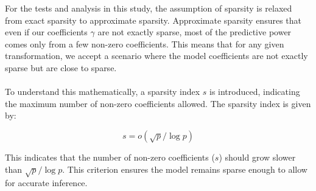 For the tests and analysis in this study, the assumption of sparsity is relaxed from exact sparsity to approximate sparsity. Approximate sparsity ensures that even if our coefficients $\gamma$ are not exactly sparse, most of the predictive power comes only from a few non-zero coefficients. This means that for any given transformation, we accept a scenario where the model coefficients are not exactly sparse but are close to sparse.\\
\\
To understand this mathematically, a sparsity index $s$ is introduced, indicating the maximum number of non-zero coefficients allowed. The sparsity index is given by:

\begin{equation}
s = o\left(\sqrt{p} / \log p\right)
\end{equation}

This indicates that the number of non-zero coefficients ($s$) should grow slower than $\sqrt{p}/\log p$. This criterion ensures the model remains sparse enough to allow for accurate inference. 


